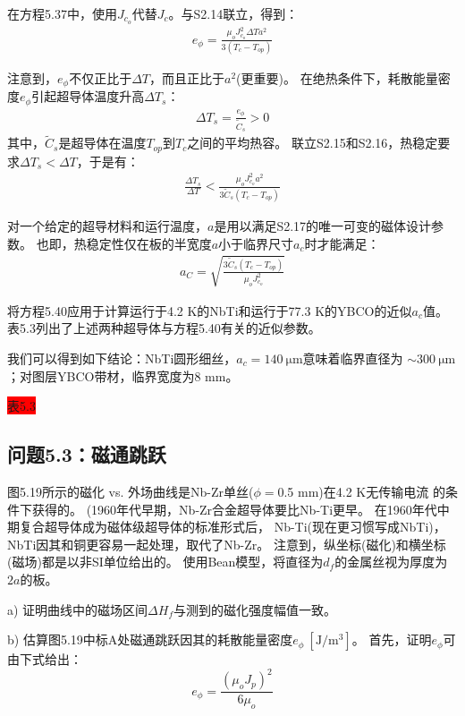 在方程5.37中，使用$J_{c_o}$代替$J_c$。与S2.14联立，得到：
\begin{align*}%
e_{\phi}=\frac{\mu_{o}J_{c_{o}}^{2}\Delta T a^{2}}{3(T_{c}-T_{op})}\tag{S2.15}
\end{align*}

注意到，$e_{\phi}$不仅正比于$\Delta T$，而且正比于$a^2$(更重要)。
在绝热条件下，耗散能量密度$e_{\phi}$引起超导体温度升高$\Delta T_s$：
\begin{align*}%
\Delta T_{s}=\frac{e_{\phi}}{\tilde{C}_{s}}>0\tag{S2.16}
\end{align*}
其中，$\tilde{C}_{s}$是超导体在温度$T_{op}$到$T_c$之间的平均热容。
联立S2.15和S2.16，热稳定要求$\Delta T_s <\Delta T$，于是有：
\begin{align*}%
\frac{\Delta T_{s}}{\Delta T}<\frac{\mu_{o}J_{c_{o}}^{2}a^{2}}{3\tilde{C}_{s}(T_{c}-T_{op})}\tag{S2.17}
\end{align*}

对一个给定的超导材料和运行温度，$a$是用以满足S2.17的唯一可变的磁体设计参数。
也即，热稳定性仅在板的半宽度$a$小于临界尺寸$a_c$时才能满足：
\begin{align*}%
a_{C}=\sqrt{\frac{3\tilde{C}_{s}(T_{c}-T_{op})}{\mu_{o}J_{c_{o}}^{2}}}\tag{5.40}
\end{align*}

将方程5.40应用于计算运行于4.2 K的NbTi和运行于77.3 K的YBCO的近似$a_c$值。
 表5.3列出了上述两种超导体与方程5.40有关的近似参数。

我们可以得到如下结论：NbTi圆形细丝，$a_c=140\ \mathrm{\mu m}$意味着临界直径为
$\sim 300\ \mathrm{\mu m}$；对图层YBCO带材，临界宽度为8 mm。

\colorbox{red}{表5.3}

\subsection{问题5.3：磁通跳跃}
图5.19所示的磁化 vs. 外场曲线是Nb-Zr单丝($\phi=$0.5 mm)在4.2 K无传输电流
的条件下获得的。 (1960年代早期，Nb-Zr合金超导体要比Nb-Ti更早。
在1960年代中期复合超导体成为磁体级超导体的标准形式后，
Nb-Ti(现在更习惯写成NbTi)，NbTi因其和铜更容易一起处理，取代了Nb-Zr。
注意到，纵坐标(磁化)和横坐标(磁场)都是以非SI单位给出的。
使用Bean模型，将直径为$d_f$的金属丝视为厚度为$2a$的板。

a) 证明曲线中的磁场区间$\Delta H_f$与测到的磁化强度幅值一致。

b) 估算图5.19中标A处磁通跳跃因其的耗散能量密度$e_{\phi}\ [\mathrm{J/m^3}]$。
首先，证明$e_{\phi}$可由下式给出：
\begin{equation}%
e_{\phi}=\frac{(\mu_{o}J_{p})^{2}}{6\mu_{o}}
\end{equation}

